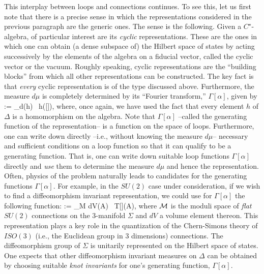This interplay between loops and connections continues. To see this, let
us first note that there is a precise sense in which the representations
considered in the previous paragraph are the generic ones. The sense is
the following. Given a $C^\star$-algebra, of particular interest are its
{\it cyclic} representations. These are the ones in which one can obtain
(a dense subspace of) the Hilbert space of states by acting successively by
the elements of the algebra on a fiducial vector, called the cyclic vector
or the vacuum. Roughly speaking, cyclic representations are the ``building
blocks'' from which all other representations can be constructed. The key
fact is that {\it every} cyclic representation is of the type discussed above.
Furthermore, the measure $d\mu$ is completely determined by its ``Fourier
transform,'' $\Gamma[\alpha]$, given by
\bneq
\Gamma[\alpha] := \lint_\Delta d\mu(h) \, \- \- h([\alpha]),
where, once again, we have used the fact that every element $h$ of $\Delta$
is a homomorphism on the algebra. Note that $\Gamma[\alpha]$ --called
the generating function of the representation-- is a function on the space
of loops. Furthermore, one can write down directly --i.e., without knowing
the measure $d\mu$-- necessary and sufficient conditions on a loop function
so that it can qualify to be a generating function. That is, one can write
down suitable loop functions $\Gamma[\alpha]$ directly and {\it use} them
to determine the measure $d\mu$ and hence the representation. Often,
physics of the problem naturally leads to candidates for the generating
functions $\Gamma [\alpha]$. For example, in the $SU(2)$ case under
consideration, if we wish to find a diffeomorphism invariant representation,
we could use for $\Gamma[\alpha]$ the following function:
\bneq
\Gamma[\alpha] := \lint_{\cal M} dV(A) \- \, \-  T[\alpha](A),
where ${\cal M}$ is the moduli space of {\it flat} $SU(2)$ connections
on the 3-manifold $\Sigma$ and $dV$ a volume element thereon.
This representation plays a key role in the
quantization of the Chern-Simons theory of  $ISO(3)$ (i.e., the Euclidean
group in 3 dimensions) connections. The diffeomorphism group of $\Sigma$
is unitarily represented on the Hilbert space of states. One expects
that other diffeomorphism invariant measures on $\Delta$ can be
obtained by choosing suitable {\it knot invariants} for one's generating
function, $\Gamma[\alpha ]$.

